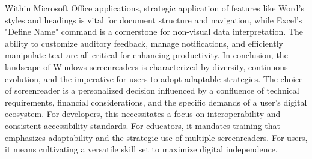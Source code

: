 Within Microsoft Office applications, strategic application of features like Word's styles and headings is vital for document structure and navigation, while Excel's "Define Name" command is a cornerstone for non-visual data interpretation. The ability to customize auditory feedback, manage notifications, and efficiently manipulate text are all critical for enhancing productivity.
In conclusion, the landscape of Windows screenreaders is characterized by diversity, continuous evolution, and the imperative for users to adopt adaptable strategies. The choice of screenreader is a personalized decision influenced by a confluence of technical requirements, financial considerations, and the specific demands of a user's digital ecosystem. For developers, this necessitates a focus on interoperability and consistent accessibility standards. For educators, it mandates training that emphasizes adaptability and the strategic use of multiple screenreaders. For users, it means cultivating a versatile skill set to maximize digital independence.
